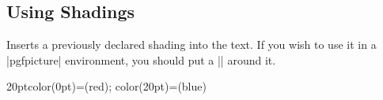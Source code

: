 \subsection{Using Shadings}
\label{section-shading-a-path}

\begin{command}{\pgfuseshading{}}
  Inserts a previously declared shading into the text. If you wish to
  use it in a |pgfpicture| environment, you should put a |\pgfbox|
  around it.
  
\begin{codeexample}[]
\begin{pgfpicture}
    {20pt}{color(0pt)=(red); color(20pt)=(blue)}
\end{pgfpicture}
\end{codeexample}
\end{command}


